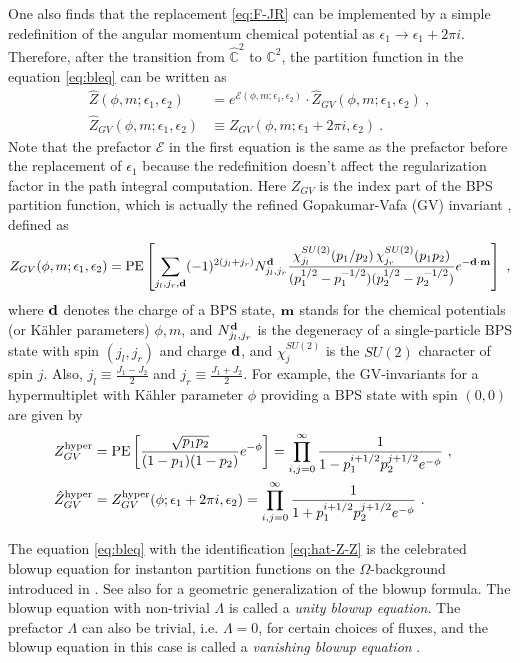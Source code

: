 One also finds that the replacement \eqref{eq:F-JR} can be implemented by a simple redefinition of the angular momentum chemical potential as $\epsilon_1\rightarrow \epsilon_1+2\pi i$. Therefore, after the transition from $\hat{\mathbb{C}}^2$ to $\mathbb{C}^2$, the partition function in the equation \eqref{eq:bleq} can be written as
\begin{align}\label{eq:hat-Z-Z}
	\hat{Z}(\phi,m;\epsilon_1,\epsilon_2) &= e^{\mathcal{E}(\phi,m;\epsilon_1,\epsilon_2)} \cdot \hat{Z}_{GV}(\phi,m;\epsilon_1,\epsilon_2) \ , \nonumber \\ 
	\hat{Z}_{GV}(\phi,m;\epsilon_1,\epsilon_2) &\equiv Z_{GV}(\phi,m;\epsilon_1+2\pi i,\epsilon_2) \ .
\end{align}
Note that the prefactor $\mathcal{E}$ in the first equation is the same as the prefactor before the replacement of $\epsilon_1$ because the redefinition doesn't affect the regularization factor in the path integral computation. Here $Z_{GV}$ is the index part of the BPS partition function, which is actually the refined Gopakumar-Vafa (GV) invariant \cite{Gopakumar:1998ii,Gopakumar:1998jq}, defined as
\begin{equation}\label{eq:GV-inv}
	Z_{GV}(\phi,m;\epsilon_1,\epsilon_2) = {\rm PE}\left[\sum_{j_l,j_r,{\bf d}}(-1)^{2(j_l+j_r)} N^{\bf d}_{j_l,j_r} \frac{\chi^{SU(2)}_{j_l}(p_1/p_2)\,\chi^{SU(2)}_{j_r}(p_1p_2)}{(p_1^{1/2}-p_1^{-1/2})(p_2^{1/2}-p_2^{-1/2})}e^{-{\bf d}\cdot {\bf m}}\right] \ ,
\end{equation}
where ${\bf d}$ denotes the charge of a BPS state, ${\bf m}$ stands for the chemical potentials (or K\"ahler parameters) $\phi,m$, and $N^{\bf d}_{j_l,j_r}$ is the degeneracy of a single-particle BPS state with spin $(j_l,j_r)$ and charge ${\bf d}$, and $\chi_j^{SU(2)}$ is the $SU(2)$ character of spin $j$. Also, $j_l\equiv \tfrac{J_1-J_2}{2}$ and $j_r\equiv \tfrac{J_1+J_2}{2}$. For example, the GV-invariants for a hypermultiplet with K\"ahler parameter $\phi$ providing a BPS state with spin $(0,0)$ are given by
\begin{align}
	Z_{GV}^{\rm hyper} &= {\rm PE}\left[\frac{\sqrt{p_1p_2}}{(1-p_1)(1-p_2)}e^{-\phi}\right] = \prod_{i,j=0}^\infty \frac{1}{1-p_1^{i+1/2}p_2^{j+1/2}e^{-\phi}} \ , \quad  \nonumber \\
	\hat{Z}_{GV}^{\rm hyper} &= Z^{\rm hyper}_{GV}(\phi;\epsilon_1+2\pi i,\epsilon_2)=\prod_{i,j=0}^\infty \frac{1}{1+p_1^{i+1/2}p_2^{j+1/2}e^{-\phi}} \ .
\end{align}

The equation \eqref{eq:bleq} with the identification \eqref{eq:hat-Z-Z} is the celebrated blowup equation for instanton partition functions on the $\Omega$-background introduced in \cite{Nakajima:2003pg,Nakajima:2005fg,Gottsche:2006bm}. See also \cite{Huang:2017mis} for a geometric generalization of the blowup formula. The blowup equation with non-trivial $\Lambda$ is called a {\it unity blowup equation}. The prefactor $\Lambda$ can also be trivial, i.e. $\Lambda=0$, for certain choices of fluxes, and the blowup equation in this case is called a {\it vanishing blowup equation} \cite{Nakajima:2005fg,Huang:2017mis}.

